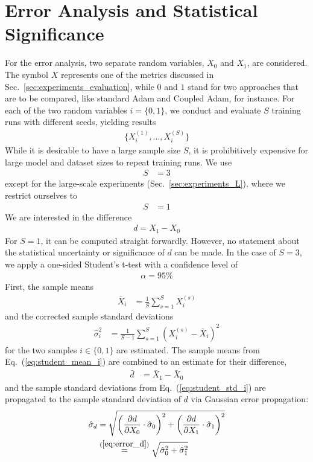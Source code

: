 \section{Error Analysis and Statistical Significance}
\label{app:error}

For the error analysis, two separate random variables, $X_0$ and $X_1$, are considered. The symbol $X$ represents one of the metrics discussed in Sec.~\ref{sec:experiments_evaluation}, while $0$ and $1$ stand for two approaches that are to be compared, like standard Adam and Coupled Adam, for instance.
For each of the two random variables $i = \{ 0, 1 \}$, we conduct and evaluate $S$ training runs with different seeds, yielding results 
\begin{align}
\{ X_i^{(1)}, \ldots, X_i^{(S)} \}
\end{align}
While it is desirable to have a large sample size $S$, it is  prohibitively expensive for large model and dataset sizes to repeat training runs. We use
\begin{align}
S &= 3
\label{eq:error_S3}
\end{align}
except for the large-scale experiments (Sec.~\ref{sec:experiments_L}), where we restrict ourselves to
\begin{align}
S &= 1
\label{eq:error_S1}
\end{align}
We are interested in the difference 
\begin{align}
d = X_1 - X_0
\label{eq:error_d}
\end{align}
For $S=1$, it can be computed straight forwardly. However, no statement about the statistical uncertainty or significance of $d$ can be made.
In the case of $S = 3$, we apply a one-sided Student's t-test with a confidence level of 
\begin{align}
\alpha = 95\%
\label{eq:error_confidence_level_alpha}
\end{align}
First, the sample means
\begin{align}
\bar X_i &= \frac{1}{S} \sum_{s=1}^S X_i^{(s)}
\label{eq:student_mean_i}
\end{align}
and the corrected sample standard deviations
\begin{align}
\hat \sigma_i^2 &= \frac{1}{S-1} \sum_{s=1}^S \left( X_i^{(s)} - \bar X_i \right)^2
\label{eq:student_std_i}
\end{align}
for the two samples $i \in \{0, 1\}$ are estimated.
The sample means from Eq.~(\ref{eq:student_mean_i}) are combined to an estimate for their difference,
\begin{align}
\bar d &= \bar X_1 - \bar X_0
\label{eq:student_mean_d}
\end{align}
and the sample standard deviations from Eq.~(\ref{eq:student_std_i}) are propagated to the sample standard deviation of $d$ via Gaussian error propagation:
\begin{align}
\hat \sigma_d &= 
\sqrt{\left( \frac{\partial d}{\partial X_0} \cdot \hat \sigma_0 \right)^2 + \left( \frac{\partial d}{\partial X_1} \cdot \hat \sigma_1 \right)^2} \nonumber \\
&\stackrel{(\ref{eq:error_d})}{=} \sqrt{\hat \sigma_0^2 + \hat \sigma_1^2}
\label{eq:sigmad}
\end{align}

